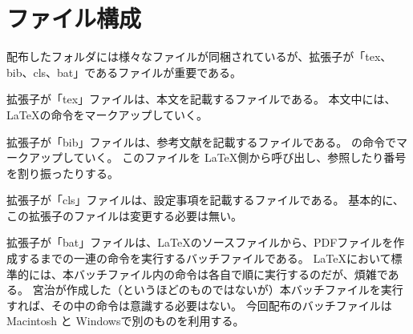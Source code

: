 \section{ファイル構成}
配布したフォルダには様々なファイルが同梱されているが、拡張子が「tex、bib、cls、bat」であるファイルが重要である。

拡張子が「tex」ファイルは、本文を記載するファイルである。
本文中には、\LaTeX の命令をマークアップしていく。

拡張子が「bib」ファイルは、参考文献を記載するファイルである。
\BibTeX の命令でマークアップしていく。
このファイルを \LaTeX 側から呼び出し、参照したり番号を割り振ったりする。

拡張子が「cls」ファイルは、設定事項を記載するファイルである。
基本的に、この拡張子のファイルは変更する必要は無い。

拡張子が「bat」ファイルは、\LaTeX のソースファイルから、PDFファイルを作成するまでの一連の命令を実行するバッチファイルである。
\LaTeX において標準的には、本バッチファイル内の命令は各自で順に実行するのだが、煩雑である。
宮治が作成した（というほどのものではないが）本バッチファイルを実行すれば、その中の命令は意識する必要はない。
今回配布のバッチファイルは Macintosh と Windowsで別のものを利用する。

